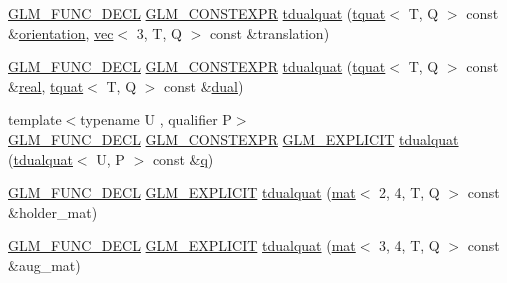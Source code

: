 \begin{DoxyCompactItemize}
\item 
\hyperlink{setup_8hpp_ab2d052de21a70539923e9bcbf6e83a51}{G\+L\+M\+\_\+\+F\+U\+N\+C\+\_\+\+D\+E\+CL} \hyperlink{setup_8hpp_a08b807947b47031d3a511f03f89645ad}{G\+L\+M\+\_\+\+C\+O\+N\+S\+T\+E\+X\+PR} \hyperlink{structglm_1_1tdualquat_aedfbe6fe7039943ccbf7d178731fa9b7}{tdualquat} (\hyperlink{structglm_1_1tquat}{tquat}$<$ T, Q $>$ const \&\hyperlink{group__gtx__rotate__vector_ga1a32fceb71962e6160e8af295c91930a}{orientation}, \hyperlink{structglm_1_1vec}{vec}$<$ 3, T, Q $>$ const \&translation)
\item 
\hyperlink{setup_8hpp_ab2d052de21a70539923e9bcbf6e83a51}{G\+L\+M\+\_\+\+F\+U\+N\+C\+\_\+\+D\+E\+CL} \hyperlink{setup_8hpp_a08b807947b47031d3a511f03f89645ad}{G\+L\+M\+\_\+\+C\+O\+N\+S\+T\+E\+X\+PR} \hyperlink{structglm_1_1tdualquat_ab86d3cf3f902945d1d774505b32f9f56}{tdualquat} (\hyperlink{structglm_1_1tquat}{tquat}$<$ T, Q $>$ const \&\hyperlink{structglm_1_1tdualquat_a25909f92feb14a77756d2e83f9ec0b20}{real}, \hyperlink{structglm_1_1tquat}{tquat}$<$ T, Q $>$ const \&\hyperlink{structglm_1_1tdualquat_a6e9bac4577ea5ff7e47104c183f3955a}{dual})
\item 
{\footnotesize template$<$typename U , qualifier P$>$ }\\\hyperlink{setup_8hpp_ab2d052de21a70539923e9bcbf6e83a51}{G\+L\+M\+\_\+\+F\+U\+N\+C\+\_\+\+D\+E\+CL} \hyperlink{setup_8hpp_a08b807947b47031d3a511f03f89645ad}{G\+L\+M\+\_\+\+C\+O\+N\+S\+T\+E\+X\+PR} \hyperlink{setup_8hpp_a6c74f5a5e7b134ab69023ff9a30d4d5d}{G\+L\+M\+\_\+\+E\+X\+P\+L\+I\+C\+IT} \hyperlink{structglm_1_1tdualquat_a1fbee84d447e37ac7542412dab82cbcf}{tdualquat} (\hyperlink{structglm_1_1tdualquat}{tdualquat}$<$ U, P $>$ const \&\hyperlink{_s_d_l__opengl_8h_a8fc1e7b9baaae687804c7eed46ca09c6}{q})
\item 
\hyperlink{setup_8hpp_ab2d052de21a70539923e9bcbf6e83a51}{G\+L\+M\+\_\+\+F\+U\+N\+C\+\_\+\+D\+E\+CL} \hyperlink{setup_8hpp_a6c74f5a5e7b134ab69023ff9a30d4d5d}{G\+L\+M\+\_\+\+E\+X\+P\+L\+I\+C\+IT} \hyperlink{structglm_1_1tdualquat_aaf58d434e56496978c027c3b7c021cfb}{tdualquat} (\hyperlink{structglm_1_1mat}{mat}$<$ 2, 4, T, Q $>$ const \&holder\+\_\+mat)
\item 
\hyperlink{setup_8hpp_ab2d052de21a70539923e9bcbf6e83a51}{G\+L\+M\+\_\+\+F\+U\+N\+C\+\_\+\+D\+E\+CL} \hyperlink{setup_8hpp_a6c74f5a5e7b134ab69023ff9a30d4d5d}{G\+L\+M\+\_\+\+E\+X\+P\+L\+I\+C\+IT} \hyperlink{structglm_1_1tdualquat_a3f557639a4737d4852919fdbbb39e133}{tdualquat} (\hyperlink{structglm_1_1mat}{mat}$<$ 3, 4, T, Q $>$ const \&aug\+\_\+mat)
\item 

\end{DoxyCompactItemize}
